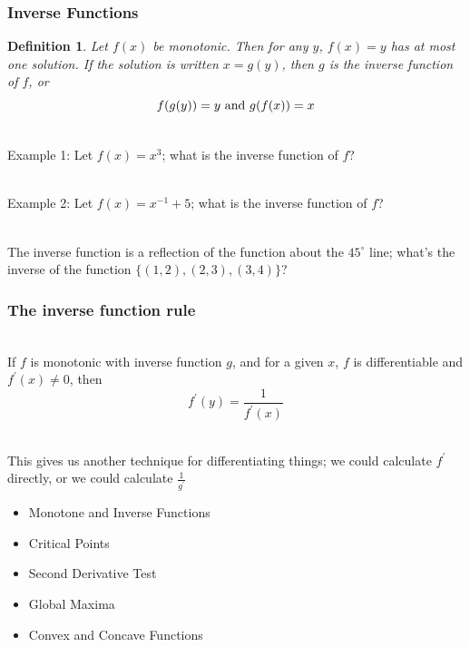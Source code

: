 \documentclass{beamer}
\newtheorem{defn}{Definition}
\numberwithin{equation}{section}
\begin{document}
\begin{frame}
\frametitle{Inverse Functions}

\begin{defn}
Let $f(x)$ be monotonic.  Then for any $y$, $f(x)=y$ has at most one solution. If the solution is written $x=g(y)$, then $g$ is the \textit{inverse function} of $f$, or $$f(g(y))=y \hbox{ and }g(f(x))=x$$
\end{defn} \pause

\ \\Example 1:  Let $f(x)=x^3$; what is the inverse function of $f$? \pause

\ \\Example 2: Let $f(x)=x^{-1}+5$; what is the inverse function of $f$? \pause

\ \\The inverse function is a reflection of the function about the $45^\circ$ line; what's the inverse of the function $\{(1, 2),(2, 3), (3, 4)\}$?

\end{frame}



\begin{frame}
\frametitle{The inverse function rule}

\ \\If $f$ is monotonic with inverse function $g$, and for a given $x$, $f$ is differentiable and $f^\prime(x)\not=0$, then $$f^\prime(y) = \frac{1}{f^\prime(x)}$$ \pause


\ \\This gives us another technique for differentiating things; we could calculate $f^\prime$ directly, or we could calculate $\frac{1}{g^\prime}$

\end{frame}



\begin{frame}

\begin{itemize}
\item \textcolor{mygray}{Monotone and Inverse Functions}
\item \textcolor{myblack}{Critical Points}
\item \textcolor{mygray}{Second Derivative Test}
\item \textcolor{mygray}{Global Maxima}
\item \textcolor{mygray}{Convex and Concave Functions}
\end{itemize}

\end{frame}
\end{document}
